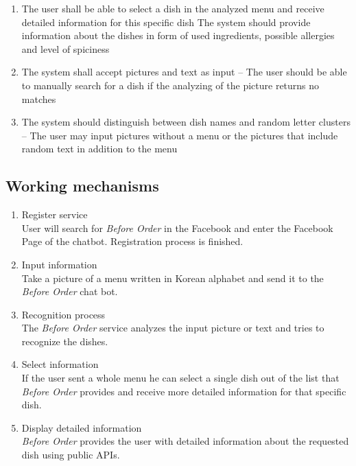 \begin{enumerate}[label=A.\arabic*]
\item The user shall be able to select a dish in the analyzed menu and receive detailed information for this specific dish
The system should provide information about the dishes in form of used ingredients, possible allergies and level of spiciness
\item The system shall accept pictures and text as input – The user should be able to manually search for a dish if the analyzing of the picture returns no matches
\item The system should distinguish between dish names and random letter clusters – The user may input pictures without a menu or the pictures that include random text in addition to the menu
\end{enumerate}

\subsection{Working mechanisms}
\begin{enumerate}
\item Register service\\
User will search for \emph{Before Order} in the Facebook and enter the Facebook Page of the chatbot. Registration process is finished.
\item Input information\\
Take a picture of a menu written in Korean alphabet and send it to the \emph{Before Order} chat bot.
\item Recognition process\\
The \emph{Before Order} service analyzes the input picture or text and tries to recognize the dishes.
\item Select information\\
If the user sent a whole menu he can select a single dish out of the list that \emph{Before Order} provides and receive more detailed information for that specific dish.
\item Display detailed information\\\emph{Before Order} provides the user with detailed information about the requested dish using public APIs.
\end{enumerate}